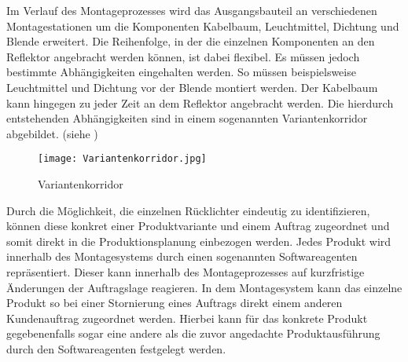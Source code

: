 Im Verlauf des Montageprozesses wird das Ausgangsbauteil an verschiedenen
Montagestationen um die Komponenten Kabelbaum, Leuchtmittel, Dichtung und
Blende erweitert. Die Reihenfolge, in der die einzelnen Komponenten an den
Reflektor angebracht werden können, ist dabei flexibel. Es müssen jedoch
bestimmte Abhängigkeiten eingehalten werden. So müssen beispielsweise 
Leuchtmittel und Dichtung vor der Blende montiert werden. Der Kabelbaum kann
hingegen zu jeder Zeit an dem Reflektor angebracht werden. Die hierdurch
entstehenden Abhängigkeiten sind in einem sogenannten Variantenkorridor
abgebildet. (siehe )

\begin{figure}[htb] 
\centering
\texttt{[image: Variantenkorridor.jpg]}
\caption[Variantenkorridor]{Variantenkorridor\protect\footnotemark}
\label{fig:Variantenkorridor}
\end{figure}

Durch die Möglichkeit, die einzelnen Rücklichter eindeutig zu identifizieren,
können diese konkret einer Produktvariante und einem Auftrag zugeordnet und
somit direkt in die Produktionsplanung einbezogen werden. Jedes Produkt wird
innerhalb des Montagesystems durch einen sogenannten Softwareagenten
repräsentiert. Dieser kann innerhalb des Montageprozesses auf kurzfristige
Änderungen der Auftragslage reagieren. In dem Montagesystem kann das einzelne 
Produkt so bei einer Stornierung eines Auftrags direkt einem anderen
Kundenauftrag zugeordnet werden. Hierbei kann für das konkrete Produkt
gegebenenfalls sogar eine andere als die zuvor angedachte Produktausführung
durch den Softwareagenten festgelegt werden.


